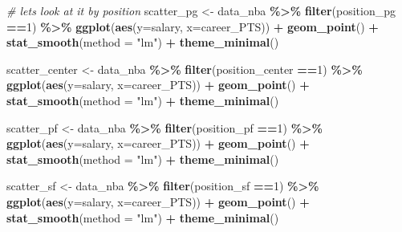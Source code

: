 \documentclass[
]{book}
\newenvironment{Shaded}{\begin{snugshade}}{\end{snugshade}}
\newcommand{\AttributeTok}[1]{\textcolor[rgb]{0.13,0.29,0.53}{#1}}
\newcommand{\CommentTok}[1]{\textcolor[rgb]{0.56,0.35,0.01}{\textit{#1}}}
\newcommand{\DecValTok}[1]{\textcolor[rgb]{0.00,0.00,0.81}{#1}}
\newcommand{\FunctionTok}[1]{\textcolor[rgb]{0.13,0.29,0.53}{\textbf{#1}}}
\newcommand{\NormalTok}[1]{#1}
\newcommand{\OtherTok}[1]{\textcolor[rgb]{0.56,0.35,0.01}{#1}}
\newcommand{\SpecialCharTok}[1]{\textcolor[rgb]{0.81,0.36,0.00}{\textbf{#1}}}
\newcommand{\StringTok}[1]{\textcolor[rgb]{0.31,0.60,0.02}{#1}}
\begin{document}
\begin{Shaded}
\begin{Highlighting}[]
\CommentTok{\# let\textquotesingle{}s look at it by position}
\NormalTok{scatter\_pg }\OtherTok{\textless{}{-}}\NormalTok{ data\_nba }\SpecialCharTok{\%\textgreater{}\%} \FunctionTok{filter}\NormalTok{(position\_pg }\SpecialCharTok{==}\DecValTok{1}\NormalTok{) }\SpecialCharTok{\%\textgreater{}\%}
  \FunctionTok{ggplot}\NormalTok{(}\FunctionTok{aes}\NormalTok{(}\AttributeTok{y=}\NormalTok{salary, }\AttributeTok{x=}\NormalTok{career\_PTS)) }\SpecialCharTok{+}
    \FunctionTok{geom\_point}\NormalTok{() }\SpecialCharTok{+} 
     \FunctionTok{stat\_smooth}\NormalTok{(}\AttributeTok{method =} \StringTok{"lm"}\NormalTok{) }\SpecialCharTok{+} 
       \FunctionTok{theme\_minimal}\NormalTok{()}

\NormalTok{scatter\_center }\OtherTok{\textless{}{-}}\NormalTok{ data\_nba }\SpecialCharTok{\%\textgreater{}\%} \FunctionTok{filter}\NormalTok{(position\_center }\SpecialCharTok{==}\DecValTok{1}\NormalTok{) }\SpecialCharTok{\%\textgreater{}\%}
  \FunctionTok{ggplot}\NormalTok{(}\FunctionTok{aes}\NormalTok{(}\AttributeTok{y=}\NormalTok{salary, }\AttributeTok{x=}\NormalTok{career\_PTS)) }\SpecialCharTok{+}
    \FunctionTok{geom\_point}\NormalTok{() }\SpecialCharTok{+} 
     \FunctionTok{stat\_smooth}\NormalTok{(}\AttributeTok{method =} \StringTok{"lm"}\NormalTok{) }\SpecialCharTok{+} 
       \FunctionTok{theme\_minimal}\NormalTok{()}

\NormalTok{scatter\_pf }\OtherTok{\textless{}{-}}\NormalTok{ data\_nba }\SpecialCharTok{\%\textgreater{}\%} \FunctionTok{filter}\NormalTok{(position\_pf }\SpecialCharTok{==}\DecValTok{1}\NormalTok{) }\SpecialCharTok{\%\textgreater{}\%}
  \FunctionTok{ggplot}\NormalTok{(}\FunctionTok{aes}\NormalTok{(}\AttributeTok{y=}\NormalTok{salary, }\AttributeTok{x=}\NormalTok{career\_PTS)) }\SpecialCharTok{+}
    \FunctionTok{geom\_point}\NormalTok{() }\SpecialCharTok{+} 
     \FunctionTok{stat\_smooth}\NormalTok{(}\AttributeTok{method =} \StringTok{"lm"}\NormalTok{) }\SpecialCharTok{+} 
       \FunctionTok{theme\_minimal}\NormalTok{()}

\NormalTok{scatter\_sf }\OtherTok{\textless{}{-}}\NormalTok{ data\_nba }\SpecialCharTok{\%\textgreater{}\%} \FunctionTok{filter}\NormalTok{(position\_sf }\SpecialCharTok{==}\DecValTok{1}\NormalTok{) }\SpecialCharTok{\%\textgreater{}\%}
  \FunctionTok{ggplot}\NormalTok{(}\FunctionTok{aes}\NormalTok{(}\AttributeTok{y=}\NormalTok{salary, }\AttributeTok{x=}\NormalTok{career\_PTS)) }\SpecialCharTok{+}
    \FunctionTok{geom\_point}\NormalTok{() }\SpecialCharTok{+} 
     \FunctionTok{stat\_smooth}\NormalTok{(}\AttributeTok{method =} \StringTok{"lm"}\NormalTok{) }\SpecialCharTok{+} 
       \FunctionTok{theme\_minimal}\NormalTok{()}


\end{Highlighting}
\end{Shaded}
\end{document}
